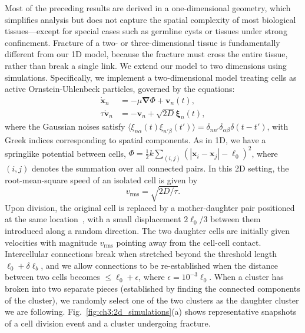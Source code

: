 Most of the preceding results are derived in a one-dimensional geometry, which simplifies analysis but does not capture the spatial complexity of most biological tissues---except for special cases such as germline cysts or tissues under strong confinement. Fracture of a two- or three-dimensional tissue is fundamentally different from our 1D model, because the fracture must cross the entire tissue, rather than break a single link. We extend our model to two dimensions using simulations. Specifically, we implement a two-dimensional model treating cells as active Ornstein-Uhlenbeck particles, governed by the equations:
\begin{subequations}
\begin{align}
    \dot{\mathbf{x}}_n &= -\mu \bm{\nabla}\Phi + \mathbf{v}_n(t),\\
    \tau \dot{\mathbf{v}}_n&=-\mathbf{v}_n+\sqrt{2D}\bm{\xi}_n(t),
\end{align}
\end{subequations}
where the Gaussian noises satisfy $\langle \xi_{n\alpha}(t)\xi_{n'\beta}(t')\rangle = \delta_{nn'}\delta_{\alpha\beta}\delta(t-t')$, with Greek indices corresponding to spatial components. As in 1D, we have a springlike potential between cells, $\Phi=\frac{1}{2} k\sum_{(i,j)}(|\mathbf{x}_i -\mathbf{x}_j|-\ell_0)^2$, where $(i,j)$ denotes the summation over all connected pairs. In this 2D setting, the root-mean-square speed of an isolated cell is given by
\begin{equation}
    v_\textrm{rms}=\sqrt{2D/\tau}.
\end{equation}
Upon division, the original cell is replaced by a mother-daughter pair positioned at the same location~\cite{soumya2015coherent}, with a small displacement $2\ell_0/3$ between them introduced along a random direction. The two daughter cells are initially given velocities with magnitude $v_\textrm{rms}$ pointing away from the cell-cell contact. Intercellular connections break when stretched beyond the threshold length $\ell_0+\delta\ell_b$, and we allow connections to be re-established when the distance between two cells becomes $\leqslant\ell_0+\epsilon$, where $\epsilon = 10^{-3}\ell_0$. When a cluster has broken into two separate pieces (established by finding the connected components of the cluster), we randomly select one of the two clusters as the daughter cluster we are following. Fig.~\ref{fig:ch3:2d_simulations}(a) shows representative snapshots of a cell division event and a cluster undergoing fracture.

